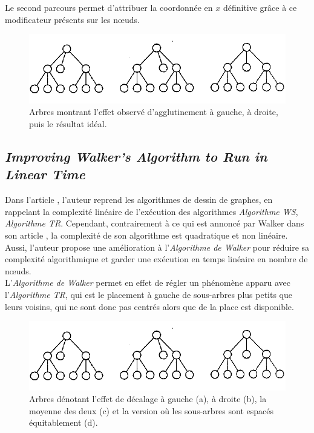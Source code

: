 \documentclass{article}
\begin{document}
  Le second parcours permet d'attribuer la coordonnée en $x$ définitive grâce à ce modificateur présents sur les n\oe{}uds.\\
  
   \vfill
  \begin{figure}[h]
    \begin{center}
        \includegraphics[scale=0.5]{arbreWalker.png}
    \end{center}
    \caption{Arbres montrant l'effet observé d'agglutinement à gauche, à droite, puis le résultat idéal.
	\cite{article90}}
  \label{fig:arbresAlgoWS}
\end{figure}
\vfill
  
  
  \subsection{\emph{Improving Walker’s Algorithm to Run in Linear Time}}
  
  Dans l'article \cite{article02}, l'auteur reprend les algorithmes de dessin de graphes, en rappelant la complexité linéaire de l'exécution des algorithmes \emph{Algorithme WS}, \emph{Algorithme TR}. Cependant, contrairement à ce qui est annoncé par Walker dans son article \cite{article90}, la complexité de son algorithme est quadratique et non linéaire. Aussi, l'auteur propose une amélioration à l'\emph{Algorithme de Walker} pour réduire sa complexité algorithmique et garder une exécution en temps linéaire en nombre de n\oe{}uds.\\
  
  L'\emph{Algorithme de Walker} permet en effet de régler un phénomène apparu avec l'\emph{Algorithme TR}, qui est le placement à gauche de sous-arbres plus petits que leurs voisins, qui ne sont donc pas centrés alors que de la place est disponible.\\
  
  
  \vfill
  \begin{figure}[h]
    \begin{center}
        \includegraphics[scale=0.5]{arbreWalker.png}
    \end{center}
    \caption{Arbres dénotant l'effet de décalage à gauche (a), à droite (b), la moyenne des deux (c) et la version où les sous-arbres sont espacés équitablement (d).
	\cite{article90}}
  \label{fig:arbresAlgoWS}
\end{figure}
\vfill
\end{document}
